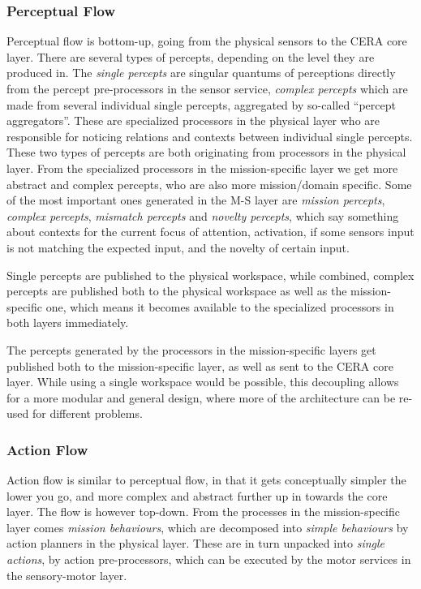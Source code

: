 \subsubsection{Perceptual Flow}
Perceptual flow is bottom-up, going from the physical sensors to the CERA core
layer. There are several types of percepts, depending on the level they are
produced in. The \textit{single percepts} are singular quantums of perceptions
directly from the percept pre-processors in the sensor service, \textit{complex
percepts} which are made from several individual single percepts, aggregated by
so-called ``percept aggregators''. These are specialized processors in the
physical layer who are responsible for noticing relations and contexts between
individual single percepts. These two types of percepts are both originating
from processors in the physical layer. From the specialized processors in the
mission-specific layer we get more abstract and complex percepts, who are also
more mission/domain specific. Some of the most important ones generated in the
M-S layer are \textit{mission percepts}, \textit{complex percepts},
\textit{mismatch percepts} and \textit{novelty percepts}, which say something
about contexts for the current focus of attention, activation, if some sensors
input is not matching the expected input, and the novelty of certain input.

Single percepts are published to the physical workspace, while combined, complex
percepts are published both to the physical workspace as well as the
mission-specific one, which means it becomes available to the specialized
processors in both layers immediately.

The percepts generated by the processors in the mission-specific layers
get published both to the mission-specific layer, as well as sent to the CERA
core layer. While using a single workspace would be possible, this decoupling
allows for a more modular and general design, where more of the architecture
can be re-used for different problems.

\subsubsection{Action Flow}
Action flow is similar to perceptual flow, in that it gets conceptually simpler
the lower you go, and more complex and abstract further up in towards the core
layer. The flow is however top-down. From the processes in the mission-specific
layer comes \textit{mission behaviours}, which are decomposed into
\textit{simple behaviours} by action planners in the physical layer. These are
in turn unpacked into \textit{single actions}, by action pre-processors, which
can be executed by the motor services in the sensory-motor layer.

